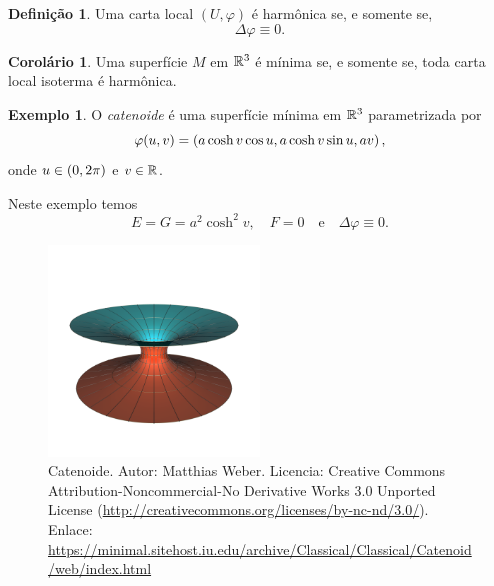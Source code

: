 \documentclass[12pt,a4paper]{beamer}
\theoremstyle{definition}
\newtheorem{definicao}{Definição}
\newtheorem{exemplo}{Exemplo}
\newtheorem{corolario}{Corolário}
\begin{document}
\begin{frame}
	\begin{definicao}
		Uma carta local $(U,\varphi)$ é harmônica se, e somente se,
		\begin{equation*}
			\Delta \varphi \equiv 0.
		\end{equation*}
	\end{definicao}
	
	\begin{corolario}
		Uma superfície $M$ em $\mathbb R^3$ é mínima se, e somente se, toda carta local isoterma é harmônica.
	\end{corolario}
\end{frame}

\begin{frame}
	\begin{exemplo}
		O \emph{catenoide} é uma superfície mínima em $\mathbb R^3$ parametrizada por
		\begin{equation*}
			\varphi(u,v) = \left( a \cosh v \cos u, a \cosh v \sin u, a v \right),
		\end{equation*}
		onde  $u \in \left( 0, 2\pi \right)$ e $v \in \mathbb R$.
	\end{exemplo}

	Neste exemplo temos
	\begin{equation*}
		E = G = a^2 \cosh^2 v, \quad F = 0 \quad \text{e} \quad \Delta \varphi \equiv 0.
	\end{equation*}
\end{frame}

\begin{frame}
	\begin{figure}
		\centering
		\includegraphics[width=0.5\textwidth]{images/catenoid}
		\caption{Catenoide. Autor: Matthias Weber. Licencia: Creative Commons Attribution-Noncommercial-No Derivative Works 3.0 Unported License (\url{http://creativecommons.org/licenses/by-nc-nd/3.0/}). Enlace: \url{https://minimal.sitehost.iu.edu/archive/Classical/Classical/Catenoid/web/index.html}}
	\end{figure}
\end{frame}
\end{document}

